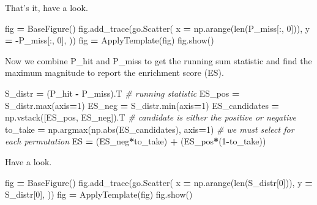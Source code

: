 \documentclass[
]{book}
\newenvironment{Shaded}{\begin{snugshade}}{\end{snugshade}}
\newcommand{\BuiltInTok}[1]{#1}
\newcommand{\CommentTok}[1]{\textcolor[rgb]{0.56,0.35,0.01}{\textit{#1}}}
\newcommand{\DecValTok}[1]{\textcolor[rgb]{0.00,0.00,0.81}{#1}}
\newcommand{\NormalTok}[1]{#1}
\newcommand{\OperatorTok}[1]{\textcolor[rgb]{0.81,0.36,0.00}{\textbf{#1}}}
\begin{document}
That's it, have a look.

\begin{Shaded}
\begin{Highlighting}[numbers=left,,]
\NormalTok{fig }\OperatorTok{=}\NormalTok{ BaseFigure()}
\NormalTok{fig.add\_trace(go.Scatter(}
\NormalTok{    x }\OperatorTok{=}\NormalTok{ np.arange(}\BuiltInTok{len}\NormalTok{(P\_miss[:, }\DecValTok{0}\NormalTok{])),}
\NormalTok{    y }\OperatorTok{=} \OperatorTok{{-}}\NormalTok{P\_miss[:, }\DecValTok{0}\NormalTok{],}
\NormalTok{))}
\NormalTok{fig }\OperatorTok{=}\NormalTok{ ApplyTemplate(fig)}
\NormalTok{fig.show()}
\end{Highlighting}
\end{Shaded}

Now we combine P\_hit and P\_miss to get the running sum statistic
and find the maximum magnitude to report the enrichment score (ES).

\begin{Shaded}
\begin{Highlighting}[numbers=left,,]
\NormalTok{S\_distr }\OperatorTok{=}\NormalTok{ (P\_hit }\OperatorTok{{-}}\NormalTok{ P\_miss).T }\CommentTok{\# running statistic}
\NormalTok{ES\_pos }\OperatorTok{=}\NormalTok{ S\_distr.}\BuiltInTok{max}\NormalTok{(axis}\OperatorTok{=}\DecValTok{1}\NormalTok{)}
\NormalTok{ES\_neg }\OperatorTok{=}\NormalTok{ S\_distr.}\BuiltInTok{min}\NormalTok{(axis}\OperatorTok{=}\DecValTok{1}\NormalTok{)}
\NormalTok{ES\_candidates }\OperatorTok{=}\NormalTok{ np.vstack([ES\_pos, ES\_neg]).T       }\CommentTok{\# candidate is either the positive or negative}
\NormalTok{to\_take }\OperatorTok{=}\NormalTok{ np.argmax(np.}\BuiltInTok{abs}\NormalTok{(ES\_candidates), axis}\OperatorTok{=}\DecValTok{1}\NormalTok{)  }\CommentTok{\# we must select for each permutation}
\NormalTok{ES }\OperatorTok{=}\NormalTok{ (ES\_neg}\OperatorTok{*}\NormalTok{to\_take) }\OperatorTok{+}\NormalTok{ (ES\_pos}\OperatorTok{*}\NormalTok{(}\DecValTok{1}\OperatorTok{{-}}\NormalTok{to\_take))}
\end{Highlighting}
\end{Shaded}

Have a look.

\begin{Shaded}
\begin{Highlighting}[numbers=left,,]
\NormalTok{fig }\OperatorTok{=}\NormalTok{ BaseFigure()}
\NormalTok{fig.add\_trace(go.Scatter(}
\NormalTok{    x }\OperatorTok{=}\NormalTok{ np.arange(}\BuiltInTok{len}\NormalTok{(S\_distr[}\DecValTok{0}\NormalTok{])),}
\NormalTok{    y }\OperatorTok{=}\NormalTok{ S\_distr[}\DecValTok{0}\NormalTok{],}
\NormalTok{))}
\NormalTok{fig }\OperatorTok{=}\NormalTok{ ApplyTemplate(fig)}
\NormalTok{fig.show()}
\end{Highlighting}
\end{Shaded}
\end{document}
